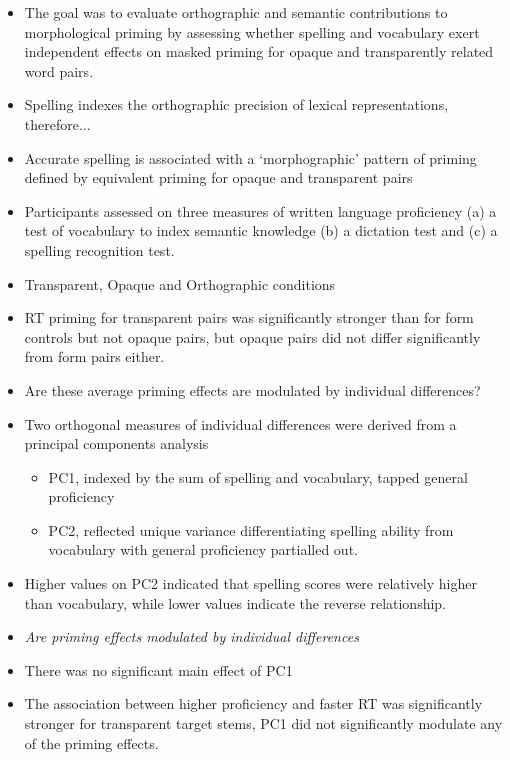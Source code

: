 \documentclass[]{article}
\begin{document}
\begin{itemize}
			\item The goal was to evaluate orthographic and semantic contributions to morphological priming by assessing whether spelling and vocabulary exert independent effects on masked priming for opaque and transparently related word pairs.
			\item Spelling indexes the orthographic precision of lexical representations, therefore...
			\item Accurate spelling is associated with a ‘morphographic’ pattern of priming defined by equivalent priming for opaque and transparent pairs
		\end{itemize}

		\begin{itemize}
			\item Participants  assessed on three measures of written language proficiency (a) a test of vocabulary to index semantic knowledge (b) a dictation test and (c) a spelling recognition test.
			\item Transparent, Opaque and Orthographic conditions
			\item RT priming for transparent pairs was significantly stronger than for form controls but not opaque pairs, but opaque pairs did not differ significantly from form pairs either.
			\item Are these average priming effects are modulated by individual differences?
			\item  Two orthogonal measures of individual differences were derived from a principal components analysis
			\begin{itemize}
				\item PC1, indexed by the sum of spelling and vocabulary, tapped general proficiency
				\item PC2,  reflected unique variance differentiating spelling ability from vocabulary with general proficiency partialled out.
			\end{itemize}
			\item 	Higher values on PC2 indicated that spelling scores were relatively higher than vocabulary, while lower values indicate the reverse relationship.
			\item \textit{Are priming effects modulated by individual differences}
			\item  There was no significant main effect of PC1
			\item The association between higher proficiency and faster RT was significantly stronger for transparent target stems,  PC1 did not significantly modulate any of the priming effects.

\end{itemize}
\end{document}
